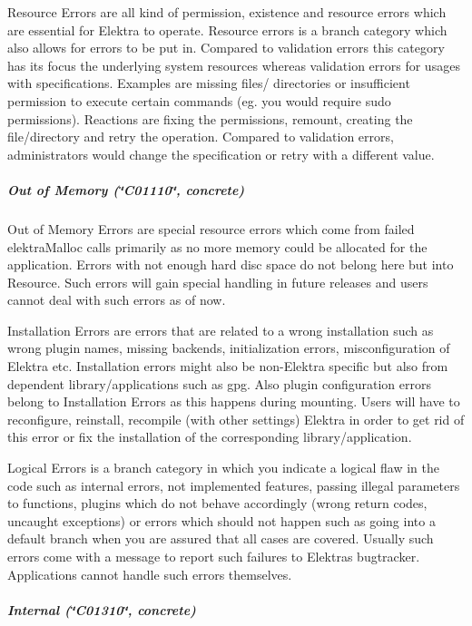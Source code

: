{\ttfamily Resource Errors} are all kind of permission, existence and resource errors which are essential for Elektra to operate. Resource errors is a branch category which also allows for errors to be put in. Compared to validation errors this category has its focus the underlying system resources whereas validation errors for usages with specifications. Examples are missing files/ directories or insufficient permission to execute certain commands (eg. you would require sudo permissions). Reactions are fixing the permissions, remount, creating the file/directory and retry the operation. Compared to validation errors, administrators would change the specification or retry with a different value.

\label{invalid_invalid}%
%
\subparagraph*{Out of Memory (\char`\"{}\+C01110\char`\"{}, concrete)}

{\ttfamily Out of Memory Errors} are special resource errors which come from failed {\ttfamily elektra\+Malloc} calls primarily as no more memory could be allocated for the application. Errors with not enough hard disc space do not belong here but into {\ttfamily Resource}. Such errors will gain special handling in future releases and users cannot deal with such errors as of now.

{\ttfamily Installation Errors} are errors that are related to a wrong installation such as wrong plugin names, missing backends, initialization errors, misconfiguration of Elektra etc. Installation errors might also be non-\/\+Elektra specific but also from dependent library/applications such as gpg. Also plugin configuration errors belong to {\ttfamily Installation Errors} as this happens during mounting. Users will have to reconfigure, reinstall, recompile (with other settings) Elektra in order to get rid of this error or fix the installation of the corresponding library/application.

{\ttfamily Logical Errors} is a branch category in which you indicate a logical flaw in the code such as internal errors, not implemented features, passing illegal parameters to functions, plugins which do not behave accordingly (wrong return codes, uncaught exceptions) or errors which should not happen such as going into a {\ttfamily default} branch when you are assured that all cases are covered. Usually such errors come with a message to report such failures to Elektra\textquotesingle{}s bugtracker. Applications cannot handle such errors themselves.

\label{invalid_invalid}%
%
\subparagraph*{Internal (\char`\"{}\+C01310\char`\"{}, concrete)}

